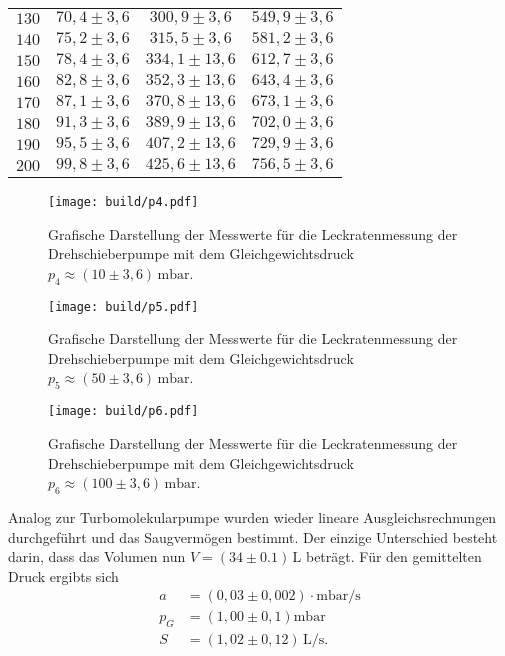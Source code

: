 \begin{table}[H]
\begin{tabular}{c c c c}
    $130$ & $ 70,4 \pm 3,6 $ & $ 300,9 \pm  3,6 $ & $ 549,9 \pm 3,6 $ \\ 
    $140$ & $ 75,2 \pm 3,6 $ & $ 315,5 \pm  3,6 $ & $ 581,2 \pm 3,6 $ \\ 
    $150$ & $ 78,4 \pm 3,6 $ & $ 334,1 \pm 13,6 $ & $ 612,7 \pm 3,6 $ \\ 
    $160$ & $ 82,8 \pm 3,6 $ & $ 352,3 \pm 13,6 $ & $ 643,4 \pm 3,6 $ \\ 
    $170$ & $ 87,1 \pm 3,6 $ & $ 370,8 \pm 13,6 $ & $ 673,1 \pm 3,6 $ \\ 
    $180$ & $ 91,3 \pm 3,6 $ & $ 389,9 \pm 13,6 $ & $ 702,0 \pm 3,6 $ \\ 
    $190$ & $ 95,5 \pm 3,6 $ & $ 407,2 \pm 13,6 $ & $ 729,9 \pm 3,6 $ \\ 
    $200$ & $ 99,8 \pm 3,6 $ & $ 425,6 \pm 13,6 $ & $ 756,5 \pm 3,6 $ \\ 
    \bottomrule
  \end{tabular}
\end{table}

\begin{figure}[H]
  \centering
  \texttt{[image: build/p4.pdf]}
  \caption{Grafische Darstellung der Messwerte für die Leckratenmessung der Drehschieberpumpe mit dem
  Gleichgewichtsdruck $p_4 \approx (10 \pm 3,6)\, \si{\milli\bar}$.}
  \label{fig:drehleck1}
\end{figure}

\begin{figure}[H]
  \centering
  \texttt{[image: build/p5.pdf]}
  \caption{Grafische Darstellung der Messwerte für die Leckratenmessung der Drehschieberpumpe mit dem
  Gleichgewichtsdruck $p_5 \approx (50 \pm 3,6)\,\si{\milli\bar}$.}
  \label{fig:drehleck2}
\end{figure}

\begin{figure}[H]
  \centering
  \texttt{[image: build/p6.pdf]}
  \caption{Grafische Darstellung der Messwerte für die Leckratenmessung der Drehschieberpumpe mit dem
  Gleichgewichtsdruck $p_6 \approx (100 \pm 3,6) \,\si{\milli\bar}$.}
  \label{fig:drehleck3}
\end{figure}
Analog zur Turbomolekularpumpe wurden wieder lineare Ausgleichsrechnungen durchgeführt und das Saugvermögen bestimmt.
Der einzige Unterschied besteht darin, dass das Volumen nun $V=(34 \pm 0.1)\,\si{\liter}$ beträgt.
Für den gemittelten Druck ergibts sich
\begin{align*}
  a &= (0,03 \pm 0,002)\cdot \si{\milli\bar\per\second} \\
  p_G &= (1,00 \pm 0,1)  \si{\milli\bar} \\
  S &= (1,02 \pm 0,12)\,\si{\liter\per\second}.
\end{align*}

